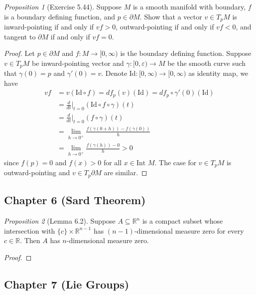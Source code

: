 \documentclass[a4paper]{article}
\theoremstyle{remark}
\newtheorem{prop}{Proposition}
\newcommand{\er}{\mathbb{R}} %
\newcommand{\rn}{\mathbb{R}^n} %
\newcommand{\doo}{\partial}    %
\newcommand{\subhim}{\subseteq} %
\newcommand{\Id}{\text{Id}} %
\begin{document}
\begin{prop}[Exercise 5.44]
Suppose $M$ is a smooth manifold with boundary, $f $ is a boundary defining function, and $p \in \doo M$. Show that a vector $v \in T_pM$ is inward-pointing if and only if $vf >0$, outward-pointing if and only if $vf<0$, and tangent to $\doo M$ if and only if $vf=0$.
\end{prop}
\begin{proof}
Let $p \in\doo M$ and $f : M \to [0,\infty)$ is the boundary defining function. Suppose $v \in T_pM$ be inward-pointing vector and $\gamma : [0,\varepsilon) \to M $ be the smooth curve such that $\gamma(0) = p$ and $\gamma'(0) = v$. Denote $\Id : [0,\infty) \to [0,\infty)$ as identity map, we have
\begin{align*}
vf &= v(\Id \circ f)=df_p(v)(\Id) = df_p \circ \gamma'(0) (\Id) \\ &= \frac{d}{dt}\bigg|_{t=0} (\Id \circ f \circ \gamma)(t) \\&= \frac{d}{dt}\bigg|_{t=0} ( f \circ \gamma)(t) \\&= \lim_{h \to 0^+} \frac{f(\gamma(0+h)) - f(\gamma(0))}{h} \\&= \lim_{h \to 0^+} \frac{f(\gamma(h)) - 0}{h} > 0 
\end{align*}
since $f(p)=0$ and $f(x)>0$ for all $x \in \text{Int }M$. The case for $v \in T_pM$ is outward-pointing and $v \in T_p\doo M$ are similar.  
\end{proof}


\subsection{Chapter 6 (Sard Theorem)}

\begin{prop}[Lemma 6.2]
Suppose $A \subhim \rn $ is a compact subset whose intersection with $\{c\} \times \mathbb{R}^{n-1}$ has $(n-1)$-dimensional measure zero for every $c \in \er$. Then $A$ has $n$-dimensional measure zero. 
\end{prop}
\begin{proof}

\end{proof}


\subsection{Chapter 7 (Lie Groups)}
\end{document}
